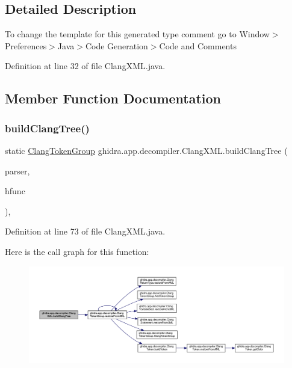 \subsection{Detailed Description}
To change the template for this generated type comment go to Window$>$Preferences$>$Java$>$Code Generation$>$Code and Comments 

Definition at line 32 of file Clang\+X\+M\+L.\+java.



\subsection{Member Function Documentation}
\mbox{\label{classghidra_1_1app_1_1decompiler_1_1_clang_x_m_l_a7d199e84524827441bde7534fa5ea4c8}} 
\subsubsection{\texorpdfstring{buildClangTree()}{buildClangTree()}}
{\footnotesize\ttfamily static \mbox{\hyperlink{classghidra_1_1app_1_1decompiler_1_1_clang_token_group}{Clang\+Token\+Group}} ghidra.\+app.\+decompiler.\+Clang\+X\+M\+L.\+build\+Clang\+Tree (\begin{DoxyParamCaption}\item[{Xml\+Pull\+Parser}]{parser,  }\item[{High\+Function}]{hfunc }\end{DoxyParamCaption})\hspace{0.3cm}{\ttfamily [inline]}, {\ttfamily [static]}}



Definition at line 73 of file Clang\+X\+M\+L.\+java.

Here is the call graph for this function\+:
\nopagebreak
\begin{figure}[H]
\begin{center}
\leavevmode
\includegraphics[width=350pt]{classghidra_1_1app_1_1decompiler_1_1_clang_x_m_l_a7d199e84524827441bde7534fa5ea4c8_cgraph}
\end{center}
\end{figure}


